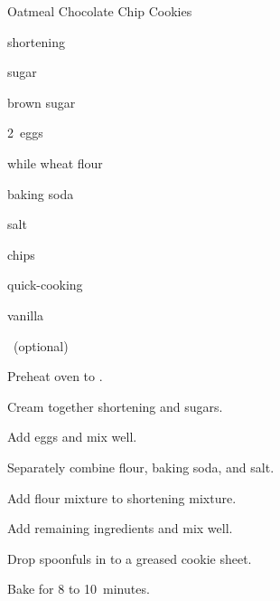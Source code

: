 \begin{recipe}{Oatmeal Chocolate Chip Cookies}{}{}

\begin{ingredients}
\item {} shortening
\item \C{\threequarter} sugar
\item \C{\threequarter} brown sugar
\item 2~eggs
\item \C{1\half} while wheat flour
\item {} baking soda
\item {} salt
\item \C{2\half}  chips
\item {} quick-cooking 
\item {} vanilla
\item {} ~(optional)
\end{ingredients}

\begin{directions}
\item Preheat oven to .
\item Cream together shortening and sugars.
\item Add eggs and mix well.
\item Separately combine flour, baking soda, and salt.
\item Add flour mixture to shortening mixture.
\item Add remaining ingredients and mix well.
\item Drop spoonfuls in to a greased cookie sheet.
\item Bake for 8 to 10~minutes.
\end{directions}

\end{recipe}

